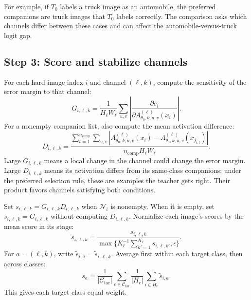 \documentclass[review,number,sort&compress]{elsarticle}
\theoremstyle{definition}
\begin{document}
For example, if $T_0$ labels a truck image as an automobile,
the preferred companions are truck images that $T_0$
labels correctly. The comparison asks which channels differ
between these cases and can affect the automobile-versus-truck
logit gap.

\subsection{Step 3: Score and stabilize channels}

For each hard image index $i$ and channel $(\ell,k)$, compute
the sensitivity of the error margin to that channel:
\begin{equation}
\label{eq:repair-sensitivity}
G_{i,\ell,k}=
\frac{1}{H_\ell W_\ell}
\sum_{u,v}
\left|
\frac{\partial e_i}
{\partial A_{\theta_0,k,u,v}^{(\ell)}(x_i)}
\right|.
\end{equation}
For a nonempty companion list, also compute the mean
activation difference:
\begin{equation}
\label{eq:repair-discrepancy}
D_{i,\ell,k}=
\frac{\sum_{t=1}^{n_{\mathrm{comp}}}\sum_{u,v}
\left|
A_{\theta_0,k,u,v}^{(\ell)}(x_i)-
A_{\theta_0,k,u,v}^{(\ell)}(x_{j_{i,t}})
\right|}
{n_{\mathrm{comp}}H_\ell W_\ell}.
\end{equation}
Large $G_{i,\ell,k}$ means a local change in the channel
could change the error margin. Large $D_{i,\ell,k}$ means
its activation differs from its same-class companions;
under the preferred selection rule, these are examples
the teacher gets right. Their product favors channels
satisfying both conditions.

Set $s_{i,\ell,k}=G_{i,\ell,k}D_{i,\ell,k}$ when
$\mathcal N_i$ is nonempty. When it is empty, set
$s_{i,\ell,k}=G_{i,\ell,k}$ without computing $D_{i,\ell,k}$.
Normalize each image's scores by the mean score in its stage:
\begin{equation}
\label{eq:repair-channel-score}
\widetilde{s}_{i,\ell,k}=
\frac{s_{i,\ell,k}}
{\max\{K_\ell^{-1}\sum_{k'=1}^{K_\ell}
s_{i,\ell,k'},\epsilon\}}.
\end{equation}
For $a=(\ell,k)$, write
$\widetilde{s}_{i,a}=\widetilde{s}_{i,\ell,k}$.
Average first within each target class, then across classes:
\begin{equation}
\label{eq:repair-consensus}
\overline{s}_a=
\frac{1}{|\mathcal C_{\mathrm{tar}}|}
\sum_{c\in\mathcal C_{\mathrm{tar}}}
\frac{1}{|H_c|}\sum_{i\in H_c}\widetilde{s}_{i,a}.
\end{equation}
This gives each target class equal weight.
\end{document}
